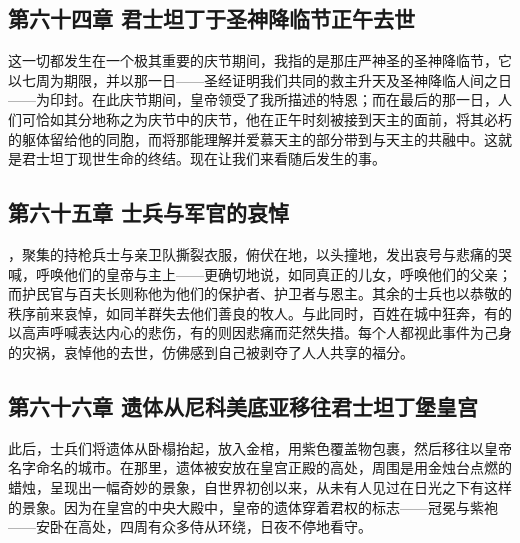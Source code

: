 
\subsection{第六十四章 君士坦丁于圣神降临节正午去世}

这一切都发生在一个极其重要的庆节期间，我指的是那庄严神圣的圣神降临节，它以七周为期限，并以那一日——圣经证明我们共同的救主升天及圣神降临人间之日——为印封。在此庆节期间，皇帝领受了我所描述的特恩；而在最后的那一日，人们可恰如其分地称之为庆节中的庆节，他在正午时刻被接到天主的面前，将其必朽的躯体留给他的同胞，而将那能理解并爱慕天主的部分带到与天主的共融中。这就是君士坦丁现世生命的终结。现在让我们来看随后发生的事。\par


\subsection{第六十五章 士兵与军官的哀悼}

，聚集的持枪兵士与亲卫队撕裂衣服，俯伏在地，以头撞地，发出哀号与悲痛的哭喊，呼唤他们的皇帝与主上——更确切地说，如同真正的儿女，呼唤他们的父亲；而护民官与百夫长则称他为他们的保护者、护卫者与恩主。其余的士兵也以恭敬的秩序前来哀悼，如同羊群失去他们善良的牧人。与此同时，百姓在城中狂奔，有的以高声呼喊表达内心的悲伤，有的则因悲痛而茫然失措。每个人都视此事件为己身的灾祸，哀悼他的去世，仿佛感到自己被剥夺了人人共享的福分。\par


\subsection{第六十六章 遗体从尼科美底亚移往君士坦丁堡皇宫}

此后，士兵们将遗体从卧榻抬起，放入金棺，用紫色覆盖物包裹，然后移往以皇帝名字命名的城市。在那里，遗体被安放在皇宫正殿的高处，周围是用金烛台点燃的蜡烛，呈现出一幅奇妙的景象，自世界初创以来，从未有人见过在日光之下有这样的景象。因为在皇宫的中央大殿中，皇帝的遗体穿着君权的标志——冠冕与紫袍——安卧在高处，四周有众多侍从环绕，日夜不停地看守。\par


